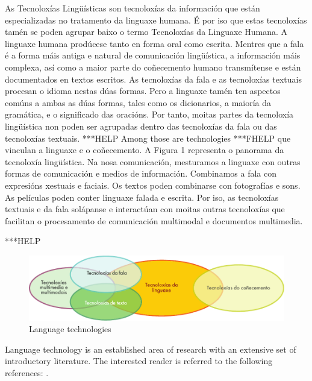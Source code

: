 \begin{multicols}{2}

  As Tecnoloxías Lingüísticas son tecnoloxías da información que están especializadas no tratamento da linguaxe humana. É por iso que estas tecnoloxías tamén se poden agrupar baixo o termo Tecnoloxías da Linguaxe Humana. A linguaxe humana prodúcese tanto en forma oral como escrita. Mentres que a fala é a forma máis antiga e natural de comunicación lingüística, a información máis complexa, así como a maior parte do coñecemento humano transmítense e están documentados en textos escritos. As tecnoloxías da fala e as tecnoloxías textuais procesan o idioma nestas dúas formas. Pero a linguaxe tamén ten aspectos comúns a ambas as dúas formas, tales como os dicionarios, a maioría da gramática, e o significado das oracións. Por tanto, moitas partes da tecnoloxía lingüística non poden ser agrupadas dentro das tecnoloxías da fala ou das tecnoloxías textuais. ***HELP Among those are technologies ***FHELP que vinculan a linguaxe e o coñecemento. A Figura 1 representa o panorama da tecnoloxía lingüística. Na nosa comunicación, mesturamos a linguaxe con outras formas de comunicación e medios de información. Combinamos a fala con expresións xestuais e faciais. Os textos poden combinarse con fotografías e sons. As películas poden conter linguaxe falada e escrita. Por iso, as tecnoloxías textuais e da fala solápanse e interactúan con moitas outras tecnoloxías que facilitan o procesamento de comunicación multimodal e documentos multimedia.

***HELP

\begin{figure}[htb]
  \center
  \includegraphics[width=\textwidth]{../_media/galician/language_technologies}
  \caption{Language technologies}
  \label{fig:ltincontext_en}
\end{figure}

Language technology is an established area of research with an extensive set of introductory literature. The interested reader is referred to the following references:  \cite{jurafsky-martin01, manning-schuetze1, lt-world1, lt-survey1}.


\end{multicols}
